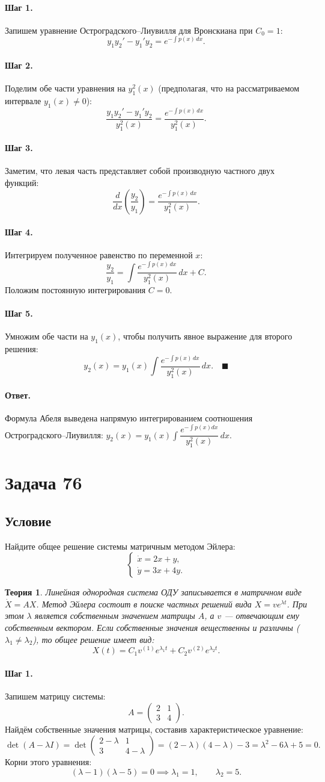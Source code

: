 \documentclass[12pt,a4paper]{article}
\theoremstyle{solution}
\newtheorem*{theory}{Теория}
\newcommand{\task}[1]{\newpage\section*{Задача #1}}
\newcommand{\answer}{\paragraph{Ответ.}}
\newcommand{\step}[1]{\paragraph{Шаг #1.}}
\begin{document}
\step{1} Запишем уравнение Остроградского–Лиувилля для Вронскиана при $C_0 = 1$:
\[
y_1 y_2' - y_1' y_2 = e^{-\int p(x)\,dx}.
\]

\step{2} Поделим обе части уравнения на $y_1^2(x)$ (предполагая, что на рассматриваемом интервале $y_1(x) \neq 0$):
\[
\frac{y_1 y_2' - y_1' y_2}{y_1^2(x)} = \frac{e^{-\int p(x)\,dx}}{y_1^2(x)}.
\]

\step{3} Заметим, что левая часть представляет собой производную частного двух функций:
\[
\frac{d}{dx} \left( \frac{y_2}{y_1} \right) = \frac{e^{-\int p(x)\,dx}}{y_1^2(x)}.
\]

\step{4} Интегрируем полученное равенство по переменной $x$:
\[
\frac{y_2}{y_1} = \int \frac{e^{-\int p(x)\,dx}}{y_1^2(x)}\,dx + C.
\]
Положим постоянную интегрирования $C = 0$.

\step{5} Умножим обе части на $y_1(x)$, чтобы получить явное выражение для второго решения:
\[
y_2(x) = y_1(x) \int \frac{e^{-\int p(x)\,dx}}{y_1^2(x)}\,dx. \quad\blacksquare
\]

\answer
Формула Абеля выведена напрямую интегрированием соотношения Остроградского–Лиувилля: $y_2(x) = y_1(x) \int \dfrac{e^{-\int p(x)dx}}{y_1^2(x)}\,dx$.

\task{76}
\subsection*{Условие}
Найдите общее решение системы матричным методом Эйлера:
\[
\begin{cases}
\dot{x} = 2x + y, \\
\dot{y} = 3x + 4y.
\end{cases}
\]

\begin{theory}
Линейная однородная система ОДУ записывается в матричном виде $\dot{X} = A X$. Метод Эйлера состоит в поиске частных решений вида $X = v e^{\lambda t}$. При этом $\lambda$ является собственным значением матрицы $A$, а $v$ — отвечающим ему собственным вектором. Если собственные значения вещественны и различны ($\lambda_1 \neq \lambda_2$), то общее решение имеет вид:
\[
X(t) = C_1 v^{(1)} e^{\lambda_1 t} + C_2 v^{(2)} e^{\lambda_2 t}.
\]
\end{theory}

\step{1} Запишем матрицу системы:
\[
A = \begin{pmatrix} 2 & 1 \\ 3 & 4 \end{pmatrix}.
\]
Найдём собственные значения матрицы, составив характеристическое уравнение:
\[
\det(A - \lambda I) = \det \begin{pmatrix} 2-\lambda & 1 \\ 3 & 4-\lambda \end{pmatrix} = (2-\lambda)(4-\lambda) - 3 = \lambda^2 - 6\lambda + 5 = 0.
\]
Корни этого уравнения:
\[
(\lambda - 1)(\lambda - 5) = 0 \implies \lambda_1 = 1, \qquad \lambda_2 = 5.
\]
\end{document}
